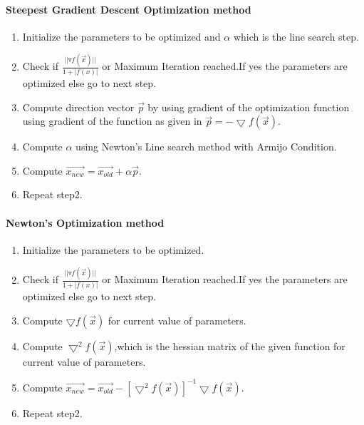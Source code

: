 \documentclass[paper=a4, fontsize=11pt]{scrartcl}
\numberwithin{equation}{section}		%
\numberwithin{figure}{section}			%
\numberwithin{table}{section}				%
\begin{document}
\paragraph{Steepest Gradient Descent Optimization method}
\begin{enumerate}
  \item Initialize the parameters to be optimized and $\alpha$ which is the line search step.
  \item Check if $\frac{||{\triangledown f(\vec{x})}||}{1+|f(x)|}$ or Maximum Iteration reached.If yes the parameters are optimized else go to next step.
  \item Compute direction vector $\vec{p}$ by using gradient of the optimization function using gradient of the function as given in $\vec{p}=-\bigtriangledown f(\vec{x})$.
  \item Compute $\alpha$ using Newton's Line search method with Armijo Condition.
  \item Compute $\vec{x_{new}}=\vec{x_{old}}+\alpha\vec{p}$.
  \item Repeat step2.
\end{enumerate}

\paragraph{Newton's Optimization method}

\begin{enumerate}
  \item Initialize the parameters to be optimized.
  \item Check if $\frac{||{\triangledown f(\vec{x})}||}{1+|f(x)|}$ or Maximum Iteration reached.If yes the parameters are optimized else go to next step.
  \item Compute $\bigtriangledown f(\vec{x})$ for current value of parameters.
  \item Compute $\bigtriangledown^2 f(\vec{x})$,which is the hessian matrix of the given function for current value of parameters.
  \item Compute $\vec{x_{new}}=\vec{x_{old}}-[\bigtriangledown^2 f(\vec{x})]^{-1} \bigtriangledown f(\vec{x})$.
  \item Repeat step2.
\end{enumerate}
\end{document}
